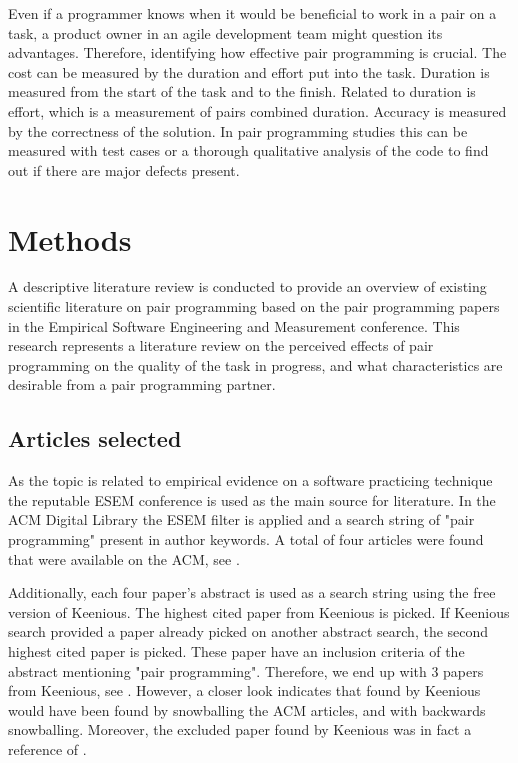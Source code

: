 \documentclass[conference]{IEEEtran}
\begin{document}
Even if a programmer knows when it would be beneficial to work in a pair on a task, a product owner in an agile development team might question its advantages. Therefore, identifying how effective pair programming is crucial. The cost can be measured by the duration and effort put into the task. Duration is measured from the start of the task and to the finish. Related to duration is effort, which is a measurement of pairs combined duration. Accuracy is measured by the correctness of the solution. In pair programming studies this can be measured with test cases or a thorough qualitative analysis of the code to find out if there are major defects present.

\section{Methods}

A descriptive literature review is conducted to provide an overview of existing scientific literature on pair programming based on the pair programming papers in the Empirical Software Engineering and Measurement conference. This research represents a literature review on the perceived effects of pair programming on the quality of the task in progress, and what characteristics are desirable from a pair programming partner. 

\subsection{Articles selected}

As the topic is related to empirical evidence on a software practicing technique the reputable ESEM conference is used as the main source for literature. In the ACM Digital Library the ESEM filter is applied and a search string of "pair programming" present in author keywords. A total of four articles were found that were available on the ACM, see \cite{10.1145/2652524.2652529, 10.1145/1414004.1414026, 10.1145/1852786.1852816, 10.1145/1159733.1159749}.

Additionally, each four paper's abstract is used as a search string using the free version of Keenious. The highest cited paper from Keenious is picked. If Keenious search provided a paper already picked on another abstract search, the second highest cited paper is picked. These paper have an inclusion criteria of the abstract mentioning "pair programming". Therefore, we end up with 3 papers from Keenious, see \cite{Williams2000Strengthening, Arisholm2007Evaluating, Hannay2009effectiveness}. However, a closer look indicates that \cite{Williams2000Strengthening, Arisholm2007Evaluating} found by Keenious would have been found by snowballing the ACM articles, and \cite{Hannay2009effectiveness} with backwards snowballing. Moreover, the excluded paper \cite{ChamorroPremuzic2003Personality} found by Keenious was in fact a reference of \cite{10.1145/1852786.1852816}.
\end{document}
